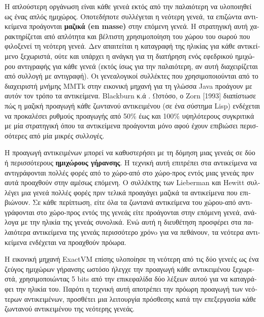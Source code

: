 \begin{greek}
Η απλούστερη οργάνωση είναι κάθε γενεά εκτός από την παλαιότερη να υλοποιηθεί ως
ένας απλός ημιχώρος. Οποτεδήποτε συλλέγεται η νεότερη γενεά, τα επιζώντα αντικείμενα
προάγονται \textbf{μαζικά (en masse)} στην επόμενη γενεά. Η στρατηγική αυτή χαρακτηρίζεται
από απλότητα και βέλτιστη χρησιμοποίηση του χώρου του σωρού που φιλοξενεί τη νεότερη
γενεά. Δεν απαιτείται η καταγραφή της ηλικίας για κάθε αντικείμενο ξεχωριστά, ούτε και
υπάρχει η ανάγκη για τη διατήρηση ενός εφεδρικού ημιχώρου αντιγραφής για κάθε γενεά
(εκτός ίσως για την παλαιότερη, αν αυτή διαχειρίζεται από συλλογή με αντιγραφή). Οι
γενεαλογικοί συλλέκτες που χρησιμοποιούνται από το διαχειριστή μνήμης MMTk στην
εικονική μηχανή για τη γλώσσα Java προάγουν με αυτόν τον τρόπο τα αντικείμενα.
Blackburn κ.ά \cite{DBLP:conf/iwmm/BlackburnH04}. Ωστόσο, ο Zorn [1993] διαπίστωσε πώς η μαζική προαγωγή κάθε
ζωντανού αντικειμένου (σε ένα σύστημα Lisp) ενδέχεται να προκαλέσει ρυθμούς
προαγωγής από 50\% έως και 100\% υψηλότερους συγκριτικά με μία στρατηγική όπου
τα αντικείμενα προάγονται μόνο αφού έχουν επιβιώσει περισσότερες από μία μικρές
συλλογές.

Η προαγωγή αντικειμένων μπορεί να καθυστερήσει με τη δόμηση
μιας γενεάς σε δύο ή περισσότερους \textbf{ημιχώρους γήρανσης}.
Η τεχνική αυτή επιτρέπει στα αντικείμενα να αντιγράφονται
πολλές φορές από το χώρο-από στο χώρο-προς εντός μιας γενεάς
πριν αυτά προαχθούν στην αμέσως επόμενη. Ο συλλέκτης των Lieberman
και Hewitt \cite{DBLP:journals/cacm/LiebermanH83} συλλέγει μια
γενεά πολλές φορές πριν τελικά προαγάγει μαζικά τα αντικείμενα
που επιβιώνουν. Σε κάθε περίπτωση, είτε όλα τα ζωντανά αντικείμενα
του χώρου-από αντιγράφονται στο χώρο-προς εντός της γενεάς είτε
προάγονται στην επόμενη γενεά, ανάλογα με την ηλικία της γενεάς
συνολικά. Ενώ αυτή η διευθέτηση προσφέρει στα παλαιότερα αντικείμενα
της γενεάς περισσότερο χρόνo για να πεθάνουν, τα νεότερα αντικείμενα
ενδέχεται να προαχθούν πρόωρα.

Η εικονική μηχανή ExactVM επίσης υλοποίησε τη νεότερη από τις
δύο γενεές ως ένα ζεύγος ημιχώρων γήρανσης ωστόσο ήλεγχε την
προαγωγή κάθε αντικειμένου ξεχωριστά, χρησιμοποιώντας 5 bits
από την επικεφαλίδα δύο λέξεων αυτού για να καταγράφει την
ηλικία του. Παρότι η τεχνική αυτή αποτρέπει την πρόωρη προαγωγή
των νεότερων αντικειμένων, προσθέτει μια λειτουργία πρόσθεσης
κατά την επεξεργασία κάθε ζωντανού αντικειμένου της νεότερης
γενεάς.


\end{greek}
